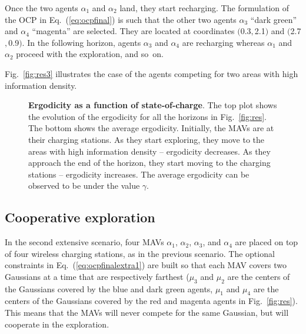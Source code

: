 \documentclass[letterpaper,10pt,conference,twoside]{IEEEtran}
\theoremstyle{definition}
\begin{document}
Once the two agents $\alpha_1$ and $\alpha_2$ land, they start recharging. The formulation of the OCP in Eq.~(\ref{eq:ocpfinal}) is such that the other two agents $\alpha_3$ ``dark green'' and $\alpha_4$ ``magenta'' are selected. They are located at coordinates $($0.3$,$2.1$)$ and $($2.7$,$0.9$)$. %
%
In the following horizon, agents $\alpha_3$ and $\alpha_4$ are recharging whereas $\alpha_1$ and $\alpha_2$ proceed with the exploration, %
and so~on.

Fig.~\ref{fig:res3} illustrates the case of the agents competing for two areas with high information density.

\begin{figure}[t!]
  \begin{minipage}[t!]{.5\columnwidth}
    \vspace*{-.2cm}
    
  \end{minipage}
  \begin{minipage}[c]{.48\columnwidth}
    \vspace*{.05cm}
    \caption{\textbf{Ergodicity %
    as a function of state-of-charge}. The top plot shows the evolution of the ergodicity for all the horizons in Fig.~\ref{fig:res}. The bottom shows the average ergodicity. Initially, the MAVs are at their charging stations. As they start exploring, they move to the areas with high information density -- ergodicity decreases. As they approach the end of the horizon, they start moving to the charging stations -- ergodicity increases. The average ergodicity can be observed to be under the value $\gamma$.}
    \label{fig:ergo}
  \end{minipage}
  \vspace*{-.4cm}
\end{figure}

\subsection*{Cooperative exploration}
\noindent
In the second extensive scenario, four MAVs $\alpha_1$, $\alpha_2$, $\alpha_3$, and $\alpha_4$ are placed on top of four wireless charging stations, as in the previous scenario. The optional constraints in Eq.~(\ref{eq:ocpfinalextra1}) are built so that each MAV covers two Gaussians at a time that are respectively farthest ($\mu_3$ and $\mu_2$ are the centers of the Gaussians covered by the blue and dark green agents, $\mu_1$ and $\mu_4$ are the centers of the Gaussians covered by the red and magenta agents in Fig.~\ref{fig:res}). This means that the MAVs will never compete for the same Gaussian, but will cooperate in the exploration. %
\end{document}
